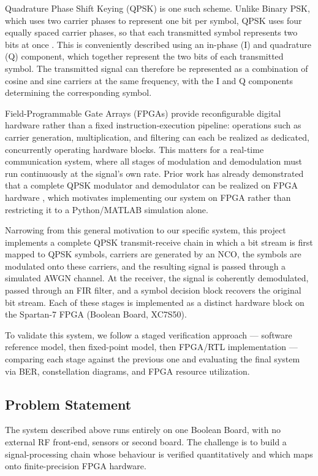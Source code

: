 \documentclass[10pt,twocolumn,letterpaper]{article}
\newcommand{\newstart}{\begingroup\color{blue}}
\begin{document}
Quadrature Phase Shift Keying (QPSK) is one such scheme. Unlike Binary
PSK, which uses two carrier phases to represent one bit per symbol,
QPSK uses four equally spaced carrier phases, so that each transmitted
symbol represents two bits at once \cite{qpsk_nptel}. This is conveniently described
using an in-phase (I) and quadrature (Q) component, which together
represent the two bits of each transmitted symbol. The transmitted
signal can therefore be represented as a combination of cosine and
sine carriers at the same frequency, with the I and Q components
determining the corresponding symbol.

Field-Programmable Gate Arrays (FPGAs) provide reconfigurable digital
hardware rather than a fixed instruction-execution pipeline: operations
such as carrier generation, multiplication, and filtering can each be
realized as dedicated, concurrently operating hardware blocks. This matters for a real-time
communication system, where all stages of modulation and demodulation
must run continuously at the signal's own rate. Prior work has already demonstrated that
a complete QPSK modulator and demodulator can be realized on FPGA
hardware \cite{7777861,6034354}, which
motivates implementing our system on FPGA rather than restricting it
to a Python/MATLAB simulation alone.

Narrowing from this general motivation to our specific system, this
project implements a complete QPSK transmit-receive chain in which a
bit stream is first mapped to QPSK symbols, carriers are generated by
an NCO, the symbols are modulated onto these carriers, and the
resulting signal is passed through a simulated AWGN channel. At the
receiver, the signal is coherently demodulated, passed through an FIR
filter, and a symbol decision block recovers the original bit stream.
Each of these stages is implemented as a distinct hardware block on
the Spartan-7 FPGA (Boolean Board, XC7S50).

To validate this system, we follow a staged verification approach --- software reference model, then fixed-point model, then FPGA/RTL implementation --- comparing each stage against the previous one and evaluating the final system via BER, constellation diagrams, and FPGA resource utilization.

\newstart
\subsection{Problem Statement}

The system described above runs entirely on one Boolean Board,
with no external RF front-end, sensors or second board. The
challenge is to build a signal-processing chain whose behaviour
is verified quantitatively and which maps onto finite-precision
FPGA hardware.
\end{document}

